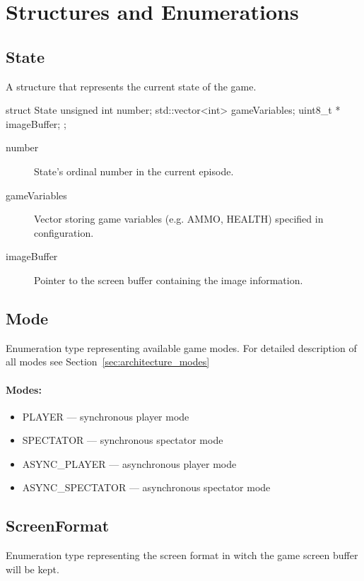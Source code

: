 \documentclass[english,bachelor,a4paper,twoside]{ppfcmthesis}
\begin{document}
\vspace{20pt}
\section{Structures and Enumerations} \label{sec:structs}
\subsection{State}

	A structure that represents the current state of the game.

\vspace{20pt}	
\begin{clinee}
	struct State {
	    unsigned int number; 
	    std::vector<int> gameVariables;
	    uint8_t * imageBuffer;
	};
\end{clinee}
\begin{description}
	\item[number] State's ordinal number in the current episode.
	\item[gameVariables] Vector storing game variables (e.g. AMMO, HEALTH) specified in configuration. 
	\item[imageBuffer] Pointer to the screen buffer containing the image information.
\end{description}
\subsection{Mode}\label{subsec:mode}
	Enumeration type representing available game modes. For detailed description of all modes see Section~\ref{sec:architecture_modes}

\paragraph{Modes:}

\begin{itemize}
	\item PLAYER --- synchronous player mode
	\item SPECTATOR --- synchronous spectator mode
	\item ASYNC\_PLAYER --- asynchronous player mode
	\item ASYNC\_SPECTATOR --- asynchronous spectator mode 
\end{itemize}

\subsection{ScreenFormat}\label{subsec:screenformat}
	Enumeration type representing the screen format in witch the game screen buffer will be kept. 
\end{document}
